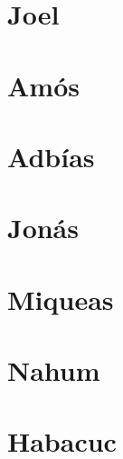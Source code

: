 \chapter{Joel}
\begin{multicols}{2}
  \raggedcolumns
  \parskip=0pt \relax
  
\end{multicols}

\chapter{Amós}
\begin{multicols}{2}
  \raggedcolumns
  \parskip=0pt \relax
  
\end{multicols}

\chapter{Adbías}
\begin{multicols}{2}
  \raggedcolumns
  \parskip=0pt \relax
  
\end{multicols}

\chapter{Jonás}
\begin{multicols}{2}
  \raggedcolumns
  \parskip=0pt \relax
  
\end{multicols}

\chapter{Miqueas}
\begin{multicols}{2}
  \raggedcolumns
  \parskip=0pt \relax
  
\end{multicols}

\chapter{Nahum}
\begin{multicols}{2}
  \raggedcolumns
  \parskip=0pt \relax
  
\end{multicols}

\chapter{Habacuc}
\begin{multicols}{2}
  \raggedcolumns
  \parskip=0pt \relax
  
\end{multicols}

